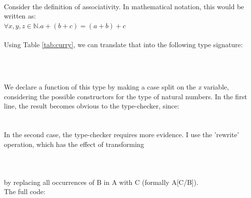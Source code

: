 \documentclass[12pt,twoside,notitlepage]{report}
\begin{document}
\begin{code}%
\>  \AgdaSymbol{:}  \<%
\\
\>[0]\<[2]%
\>[2] \AgdaSymbol{:} \<%
\\
\>[0]\<[2]%
\>[2] \<[7]%
\>[7]\AgdaSymbol{:}   \<%
\end{code}\\

\noindent Consider the definition of associativity. In mathematical notation, this would be written as:\\

\indent $\forall x, y, z \in \mathbb{N}. a + (b + c) = (a + b) + c$ \\
\\
Using Table \ref{tab:curry}, we can translate that into the following type signature: 

\begin{code}
\\
\>[0]\<[2]%
\>[2] \AgdaSymbol{:} \AgdaSymbol{(}   \AgdaSymbol{:} \AgdaSymbol{)}  \AgdaSymbol{(} \AgdaPrimitive{+} \AgdaSymbol{(} \AgdaPrimitive{+} \AgdaSymbol{))}  \AgdaSymbol{((} \AgdaPrimitive{+} \AgdaSymbol{)} \AgdaPrimitive{+} \AgdaSymbol{)}\<%
\\
\end{code}

\noindent We declare a function of this type by making a case split on the \textit{x} variable, considering the possible constructors for the type of natural numbers. In the first line, the result becomes obvious to the type-checker, since:\\ 
\indent \AgdaSymbol{(}  \AgdaPrimitive{+} \AgdaSymbol{(} \AgdaPrimitive{+} \AgdaSymbol{))} \AgdaDatatype{=}   \AgdaPrimitive{+}  \AgdaDatatype{=}\AgdaSymbol{((} \AgdaPrimitive{+} \AgdaSymbol{)} \AgdaPrimitive{+} \AgdaSymbol{)}\\\\
In the second case, the type-checker requires more evidence. I use the 'rewrite' operation, which has the effect of transforming\\\\
\indent {}     \\\\
by replacing all occurrences of B in A with C (formally A[C/B]). \\ 
The full code: \\\\
\end{document}
